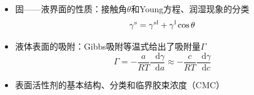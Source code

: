 \documentclass[9pt]{beamer}
\newcommand*{\dif}{\mathop{}\!\mathrm{d}}
\begin{document}
	\begin{frame}
	
	\begin{itemize}
	
	\item 固——液界面的性质：接触角$\theta$和Young方程、润湿现象的分类
	\[
		\gamma^{\rm s} = \gamma^{\rm sl} + \gamma^{\rm l} \cos{ \theta }
	\]
	
	\item 液体表面的吸附：Gibbs吸附等温式给出了吸附量$\varGamma$
	\[
		\varGamma = - \frac{ a }{ RT } \frac{ \dif \gamma }{ \dif a } \approx - \frac{ c }{ RT } \frac{ \dif \gamma }{ \dif c } 
	\]	
	
	\item 表面活性剂的基本结构、分类和临界胶束浓度（CMC）
	
	\end{itemize}		
	
	\end{frame}
	
\end{document}
